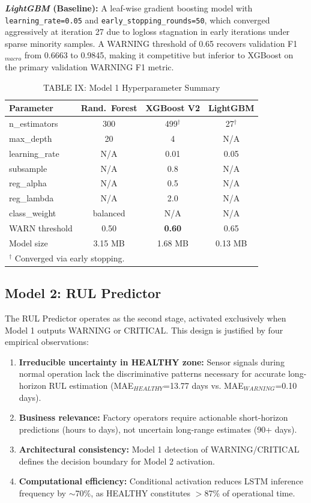 \documentclass[conference]{IEEEtran}
\begin{document}
\textbf{\textit{LightGBM} (Baseline):} A leaf-wise gradient boosting model with \texttt{learning\_rate=0.05} and \texttt{early\_stopping\_rounds=50}, which converged aggressively at iteration 27 due to logloss stagnation in early iterations under sparse minority samples. A WARNING threshold of 0.65 recovers validation F1$_{macro}$ from 0.6663 to 0.9845, making it competitive but inferior to XGBoost on the primary validation WARNING F1 metric.

\begin{table}[htbp]
\caption{TABLE IX: Model 1 Hyperparameter Summary}
\centering
\begin{tabular}{p{2.2cm}ccc}
\hline
\textbf{Parameter} & \textbf{Rand.~Forest} & \textbf{XGBoost V2} & \textbf{LightGBM} \\
\hline
n\_estimators   & 300          & 499$^{\dagger}$ & 27$^{\dagger}$ \\
max\_depth      & 20           & 4               & N/A \\
learning\_rate  & N/A          & 0.01            & 0.05 \\
subsample      & N/A          & 0.8             & N/A \\
reg\_alpha      & N/A          & 0.5             & N/A \\
reg\_lambda     & N/A          & 2.0             & N/A \\
class\_weight   & balanced     & N/A             & N/A \\
WARN threshold & 0.50         & \textbf{0.60}   & 0.65 \\
Model size     & 3.15 MB      & 1.68 MB         & 0.13 MB \\
\hline
\multicolumn{4}{l}{$^{\dagger}$ Converged via early stopping.}
\end{tabular}
\label{tab:hyper_clf}
\end{table}

\subsection{Model 2: RUL Predictor}

The RUL Predictor operates as the second stage, activated exclusively when Model 1 outputs WARNING or CRITICAL. This design is justified by four empirical observations:
\begin{enumerate}
\item \textbf{Irreducible uncertainty in HEALTHY zone:} Sensor signals during normal operation lack the discriminative patterns necessary for accurate long-horizon RUL estimation (MAE$_{HEALTHY}$=13.77 days vs. MAE$_{WARNING}$=0.10 days).
\item \textbf{Business relevance:} Factory operators require actionable short-horizon predictions (hours to days), not uncertain long-range estimates (90+ days).
\item \textbf{Architectural consistency:} Model 1 detection of WARNING/CRITICAL defines the decision boundary for Model 2 activation.
\item \textbf{Computational efficiency:} Conditional activation reduces LSTM inference frequency by $\sim$70\%, as HEALTHY constitutes $>$87\% of operational time.
\end{enumerate}
\end{document}
